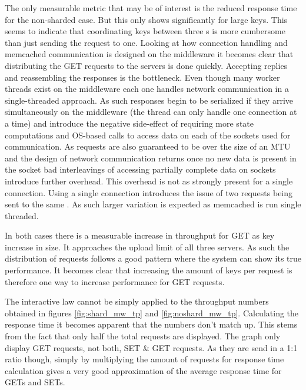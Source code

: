         The only measurable metric that may be of interest is the reduced response time for the non-sharded case. But
        this only shows significantly for large keys. This seems to indicate that coordinating keys between three
        \srv{}s is more cumbersome than just sending the request to one. Looking at how connection handling and
        memcached communication is designed on the middleware it becomes clear that distributing the GET requests to the
        servers is done quickly. Accepting replies and reassembling the responses is the bottleneck. Even though many
        worker threads exist on the middleware each one handles network communication in a single-threaded approach. As
        such responses begin to be serialized if they arrive simultaneously on the middleware (the thread can only
        handle one connection at a time) and introduce the negative side-effect of requiring more state computations and
        OS-based calls to access data on each of the sockets used for communication. As requests are also guaranteed to
        be over the size of an MTU and the design of network communication returns once no new data is present in the
        socket bad interleavings of accessing partially complete data on sockets introduce further overhead. This
        overhead is not as strongly present for a single connection. Using a single connection introduces the issue of
        two requests being sent to the same \srv{}. As such larger variation is expected as memcached is run single
        threaded.

        In both cases there is a measurable increase in throughput for GET as key increase in size. It approaches the
        upload limit of all three servers. As such the distribution of requests follows a good pattern where the system
        can show its true performance. It becomes clear that increasing the amount of keys per request is therefore one
        way to increase performance for GET requests.

        The interactive law cannot be simply applied to the throughput numbers obtained in figures \ref{fig:shard_mw_tp}
        and \ref{fig:noshard_mw_tp}. Calculating the response time it becomes apparent that the numbers don't match up.
        This stems from the fact that only half the total requests are displayed. The graph only display GET requests,
        not both, SET \& GET requests. As they are send in a 1:1 ratio though, simply by multiplying the amount of
        requests for response time calculation gives a very good approximation of the average response time for GETs and
        SETs. 
